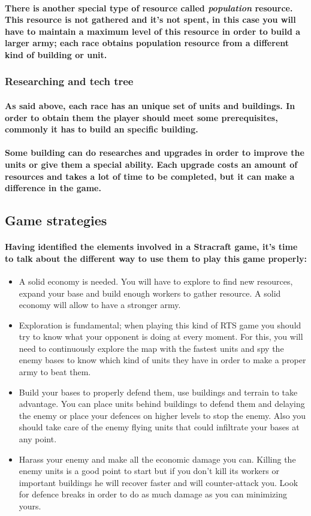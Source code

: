 \documentclass[a4paper,10pt]{article}
\newcommand{\p}[1]{\paragraph{\indent\textnormal{#1}}}
\begin{document}
     \p{There is another special type of resource called \textit{population} resource. This resource is not gathered and it's not spent, in this case you will have to maintain a maximum level of this resource in order to build a larger army; each race obtains population resource from a different kind of building or unit.}



    \subsubsection{Researching and tech tree}

      \p{As said above, each race has an unique set of units and buildings. In order to obtain them the player should meet some prerequisites, commonly it has to build an specific building.}

      \p{Some building can do researches and upgrades in order to improve the units or give them a special ability. Each upgrade costs an amount of resources and takes a lot of time to be completed, but it can make a difference in the game.}

  \subsection{Game strategies}

    \p{Having identified the elements involved in a Stracraft game, it's time to talk about the different way to use them to play this game properly:}

    \begin{itemize}
     \item A solid economy is needed. You will have to explore to find new resources, expand your base and build enough workers to gather resource. A solid economy will allow to have a stronger army.
     \item Exploration is fundamental; when playing this kind of RTS game you should try to know what your opponent is doing at every moment. For this, you will need to continuously explore the map with the fastest units and spy the enemy bases to know which kind of units they have in order to make a proper army to beat them.
     \item Build your bases to properly defend them, use buildings and terrain to take advantage. You can place units behind buildings to defend them and delaying the enemy or place your defences on higher levels to stop the enemy. Also you should take care of the enemy flying units that could infiltrate your bases at any point.
     \item Harass your enemy and make all the economic damage you can. Killing the enemy units is a good point to start but if you don't kill its workers or important buildings he will recover faster and will counter-attack you. Look for defence breaks in order to do as much damage as you can minimizing yours.
    \end{itemize}
\end{document}
